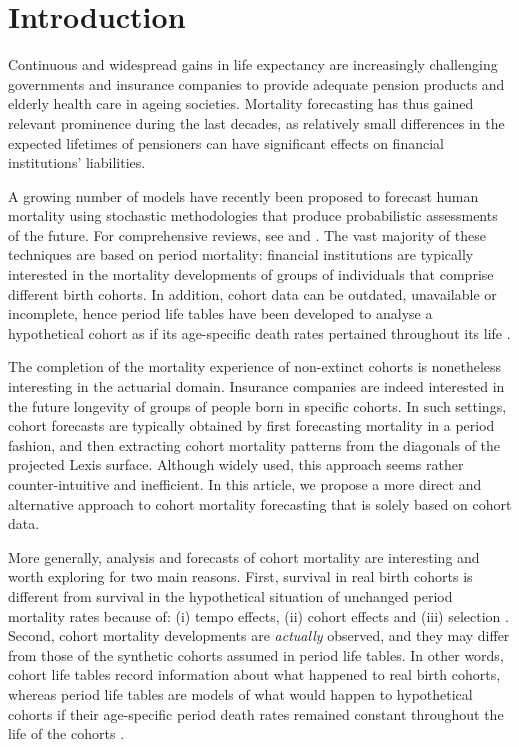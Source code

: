 \documentclass[11pt, a4paper]{article}
\begin{document}
\section{Introduction}
\label{Sec:Intro}

\linenumbers
	
Continuous and widespread gains in life expectancy \citep{riley2001rising,oeppen2002broken} are increasingly challenging governments and insurance companies to provide adequate pension products and elderly health care in ageing societies. Mortality forecasting has thus gained relevant prominence during the last decades, as relatively small differences in the expected lifetimes of pensioners can have significant effects on financial institutions' liabilities.

A growing number of models have recently been proposed to forecast human mortality using stochastic methodologies that produce probabilistic assessments of the future. For comprehensive reviews, see \cite{booth2006demographic} and \cite{shang2011point}. The vast majority of these techniques are based on period mortality: financial institutions are typically interested in the mortality developments of groups of individuals that comprise different birth cohorts. In addition, cohort data can be outdated, unavailable or incomplete, hence period life tables have been developed to analyse a hypothetical cohort as if its age-specific death rates pertained throughout its life \citep{preston2001demogr}.
 
The completion of the mortality experience of non-extinct cohorts is nonetheless interesting in the actuarial domain. Insurance companies are indeed interested in the future longevity of groups of people born in specific cohorts. In such settings, cohort forecasts are typically obtained by first forecasting mortality in a period fashion, and then extracting cohort mortality patterns from the diagonals of the projected Lexis surface. Although widely used, this approach seems rather counter-intuitive and inefficient. In this article, we propose a more direct and alternative approach to cohort mortality forecasting that is solely based on cohort data.

More generally, analysis and forecasts of cohort mortality are interesting and worth exploring for two main reasons. First, survival in real birth cohorts is different from survival in the hypothetical situation of unchanged period mortality rates because of: (i) tempo effects, (ii) cohort effects and (iii) selection \cite[for a full discussion, see][pp.~90--92]{borgan2019cohort}. Second, cohort mortality developments are \textit{actually} observed, and they may differ from those of the synthetic cohorts assumed in period life tables. In other words, cohort life tables record information about what happened to real birth cohorts, whereas period life tables are models of what would happen to hypothetical cohorts if their age-specific period death rates remained constant throughout the life of the cohorts \citep{preston2001demogr}.
\end{document}
